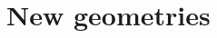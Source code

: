 \documentclass[xcolor=x11names,aspectratio=169, compress]{beamer}
\renewcommand{\(}{\begin{columns}}
\renewcommand{\)}{\end{columns}}
\newcommand{\<}[1]{\begin{column}{#1}}
\renewcommand{\>}{\end{column}}
\begin{document}


\section{New geometries}
\end{document}
